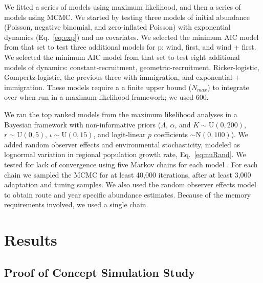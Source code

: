 \documentclass[12pt,english]{article}
\begin{document}
\begin{spacing}{1.9}
\begin{flushleft}
We fitted a series of models using maximum likelihood, 
and then a series of models using MCMC. We started by testing
three models of initial abundance (Poisson, negative binomial, and
zero-inflated Poisson) with exponential dynamics
(Eq.~\ref{eq:exp}) and no covariates.  We selected the minimum AIC model from that set to test three additional
models for p: wind, first, and wind + first. We selected the minimum
AIC model from that set to test eight additional models of dynamics:
constant-recruitment, geometric-recruitment, Ricker-logistic, Gompertz-logistic, 
the previous three with immigration, and exponential + immigration.
These models require a a finite upper bound ($N_{max}$) to integrate
over when run in a maximum likelihood
framework; we used 600. 

We ran the top ranked models from the maximum likelihood
analyses in a Bayesian framework with non-informative priors ($\Lambda$,
$\alpha$, and $K  \sim \mathrm{U}(0, 200)$, $r  \sim \mathrm{U}(0, 5)$,
$\iota  \sim \mathrm{U}(0, 15)$, and logit-linear $p$ coefficients $\sim \mathrm{N}(0, 100)$).  
We added random observer 
effects and environmental stochasticity, modeled as lognormal
variation in regional population growth rate, Eq.~\ref{eq:nuRand}.
We tested for lack of convergence using
five Markov chains for each model \citep{gelman_rubin:1992}.
For each chain we sampled the MCMC for at least 40,000 iterations, after at
least 3,000 adaptation and tuning samples.  
We also used the random observer effects model to obtain route and 
year specific abundance estimates.  Because of the memory requirements involved,
we used a single chain.  

\section*{Results}

\subsection*{Proof of Concept Simulation Study}


\end{flushleft}
\end{spacing}
\end{document}
